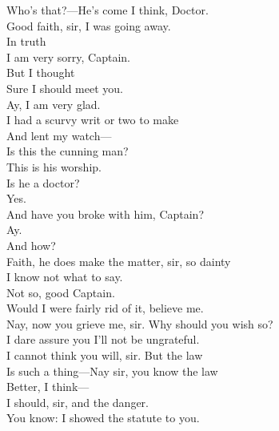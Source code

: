 \documentclass[a4paper,oneside,12pt]{memoir}
\begin{document}
\begin{drama*}
\facespeaks {} Who's that?---He's come I think, Doctor.\\
Good faith, sir, I was going away.\\
\dapperspeaks {} In truth\\
I am very sorry, Captain.\\
\facespeaks {} But I thought\\
Sure I should meet you.\\
\dapperspeaks {} Ay, I am very glad.\\
I had a scurvy writ or two to make\\
And lent my watch---\\
 Is this the cunning man?\\
\facespeaks This is his worship.\\
\dapperspeaks {} Is he a doctor?\\
\facespeaks {} Yes.\\
\dapperspeaks And have you broke with him, Captain?\\
\facespeaks {} Ay.\\
\dapperspeaks {} And how?\\
\facespeaks Faith, he does make the matter, sir, so dainty\\
I know not what to say.\\
\dapperspeaks {} Not so, good Captain.\\
\facespeaks Would I were fairly rid of it, believe me.\\
\dapperspeaks Nay, now you grieve me, sir. Why should you wish so?\\
I dare assure you I'll not be ungrateful.\\
\facespeaks I cannot think you will, sir. But the law\\
Is such a thing---Nay sir, you know the law\\
Better, I think---\\
\dapperspeaks {} I should, sir, and the danger.\\
You know: I showed the statute to you.\\

\end{drama*}
\end{document}
